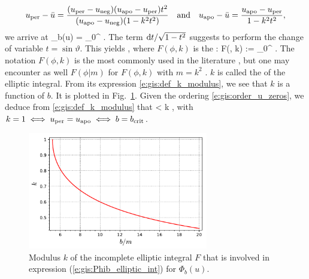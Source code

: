 \[
   u_{\rm per} - \bar{u} =
    \frac{(u_{\rm per} - u_{\rm neg})(u_{\rm apo} - u_{\rm per}) t^2}{
    (u_{\rm apo} - u_{\rm neg})(1 - k^2 t^2)}
    \quad\mbox{and}\quad
    u_{\rm apo} - \bar{u} = \frac{u_{\rm apo} - u_{\rm per}}{1 - k^2 t^2} ,
\]
we arrive at
\be
     \Phi_b(u) = 
     \int_0^{ }
      .
\ee
The term $\mathrm{d} t/\sqrt{1 - t^2}$ suggests to perform the change of
variable $t = \sin\vartheta$. This yields
\be \label{e:gis:Phib_elliptic_int}
     ,
\ee
where $F(\phi, k)$ is the
:
\be
    F(\phi, k) := \int_0^\phi {} .
\ee
The notation $F(\phi, k)$ is the most commonly used
in the literature \cite{ByrdF71,GradsRGTJ115}, but one may encounter as well
$F(\phi|m)$ for $F(\phi, k)$ with $m=k^2$ \cite{AbramS72}.
$k$ is called the  of
the elliptic integral. From its expression \eqref{e:gis:def_k_modulus}, we
see that $k$ is a function of $b$. It is plotted in Fig.~\ref{f:gis:elliptic_mod}.
Given the ordering \eqref{e:gis:order_u_zeros}, we deduce from
\eqref{e:gis:def_k_modulus} that
 < k ,
\ee
with $k=1 \iff u_{\rm per} = u_{\rm apo} \iff b = b_{\rm crit}$.
\begin{figure}
\centerline{\includegraphics[width=0.7\textwidth]{gis_elliptic_mod.pdf}}
\caption[]{\label{f:gis:elliptic_mod} \footnotesize
Modulus $k$ of the incomplete elliptic integral $F$ that is involved
in expression (\ref{e:gis:Phib_elliptic_int}) for $\Phi_b(u)$.}
\end{figure}



